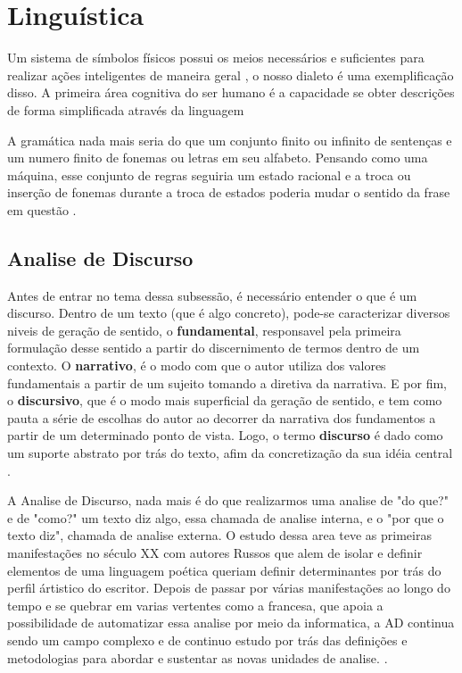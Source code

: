 \section{Linguística}

Um sistema de símbolos físicos possui os meios necessários e suficientes para realizar ações inteligentes de maneira geral \cite[116]{newell1976ComputerSA}, o nosso dialeto é uma exemplificação disso. A primeira área cognitiva do ser humano é a capacidade se obter descrições de forma simplificada através da linguagem \cite[131]{putnam1975mind}

A gramática nada mais seria do que um conjunto finito ou infinito de sentenças e um numero finito de fonemas ou letras em seu alfabeto. Pensando como uma máquina, esse conjunto de regras seguiria um estado racional e a troca ou inserção de fonemas durante a troca de estados poderia mudar o sentido da frase em questão \cite[13-16]{chomsky2002syntactic}.

\subsection{Analise de Discurso}
Antes de entrar no tema dessa subsessão, é necessário entender o que é um discurso. Dentro de um texto (que é algo concreto), pode-se caracterizar diversos niveis de geração de sentido, o \textbf{fundamental}, responsavel pela primeira formulação desse sentido a partir do discernimento de termos dentro de um contexto. O \textbf{narrativo}, é o modo com que o autor utiliza dos valores fundamentais a partir de um sujeito tomando a diretiva da narrativa. E por fim, o \textbf{discursivo}, que é o modo mais superficial da geração de sentido, e tem como pauta a série de escolhas do autor ao decorrer da narrativa dos fundamentos a partir de um determinado ponto de vista. Logo, o termo \textbf{discurso} é dado como um suporte abstrato por trás do texto, afim da concretização da sua idéia central \cite[13-17]{gregolin1995ad}.

A Analise de Discurso, nada mais é do que realizarmos uma analise de "do que?" e de "como?" um texto diz algo, essa chamada de analise interna, e o "por que o texto diz", chamada de analise externa.  O estudo dessa area teve as primeiras manifestações no século XX com autores Russos que alem de isolar e definir elementos de uma linguagem poética queriam definir determinantes por trás do perfil ártistico do escritor. Depois de passar por várias manifestações ao longo do tempo e se quebrar em varias vertentes como a francesa, que apoia a possibilidade de automatizar essa analise por meio da informatica, a AD continua sendo um campo complexo e de continuo estudo por trás das definições e metodologias para abordar e sustentar as novas unidades de analise. \cite[22]{souza2006ad}.

